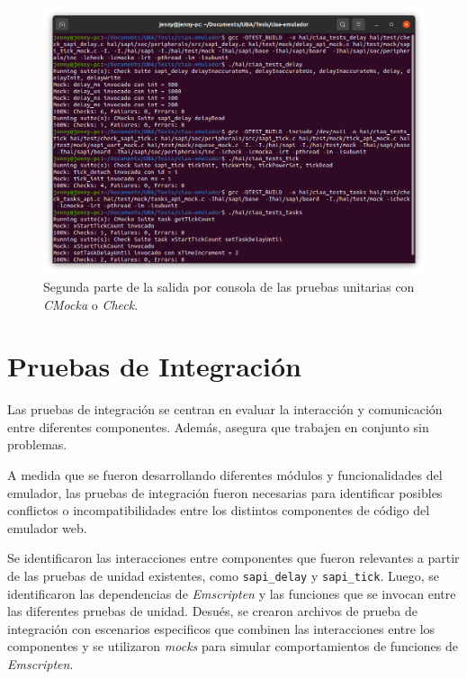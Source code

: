 \begin{figure}[ht]
	\centering
	\includegraphics[scale=.27]{./Figures/PruebasUnidad2.png}
	\caption{Segunda parte de la salida por consola de las pruebas unitarias con \textit{CMocka} o \textit{Check}.}
	\label{fig:PruebasUnidad2}
\end{figure}
 

\section{Pruebas de Integración} 
\label{subsec:Pruebas de Integración}

Las pruebas de integración se centran en evaluar la interacción y comunicación entre diferentes componentes. Además, asegura que trabajen en conjunto sin problemas.

A medida que se fueron desarrollando diferentes módulos y funcionalidades del emulador, las pruebas de integración fueron necesarias para identificar posibles conflictos o incompatibilidades entre los distintos componentes de código del emulador web.

Se identificaron las interacciones entre componentes que fueron relevantes a partir de las pruebas de unidad existentes, como \texttt{sapi\_delay} y \texttt{sapi\_tick}. Luego, se identificaron las dependencias de \textit{Emscripten} y las funciones que se invocan entre las diferentes pruebas de unidad. Desués, se crearon archivos de prueba de integración con escenarios especificos que combinen las interacciones entre los componentes y se utilizaron \textit{mocks} para simular comportamientos de funciones de \textit{Emscripten}.

